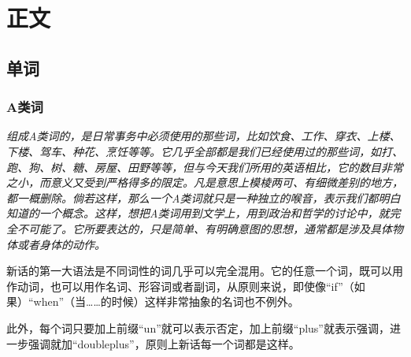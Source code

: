 \documentclass[lang=cn, color=black]{elegantbook}
\begin{document}
    \part{正文}
        \chapter{单词}
            \section{A类词}
                \textit{
                    组成A类词的，是日常事务中必须使用的那些词，比如饮食、工作、穿衣、上楼、下楼、驾车、种花、烹饪等等。它几乎全部都是我们已经使用过的那些词，如打、跑、狗、树、糖、房屋、田野等等，但与今天我们所用的英语相比，它的数目非常之小，而意义又受到严格得多的限定。凡是意思上模棱两可、有细微差别的地方，都一概删除。倘若这样，那么一个A类词就只是一种独立的喉音，表示我们都明白知道的一个概念。这样，想把A类词用到文学上，用到政治和哲学的讨论中，就完全不可能了。它所要表达的，只是简单、有明确意图的思想，通常都是涉及具体物体或者身体的动作。
                }


                新话的第一大语法是不同词性的词几乎可以完全混用。它的任意一个词，既可以用作动词，也可以用作名词、形容词或者副词，从原则来说，即使像“if”（如果）“when”（当……的时候）这样非常抽象的名词也不例外。

                此外，每个词只要加上前缀“un”就可以表示否定，加上前缀“plus”就表示强调，进一步强调就加“doubleplus”，原则上新话每一个词都是这样。
\end{document}
